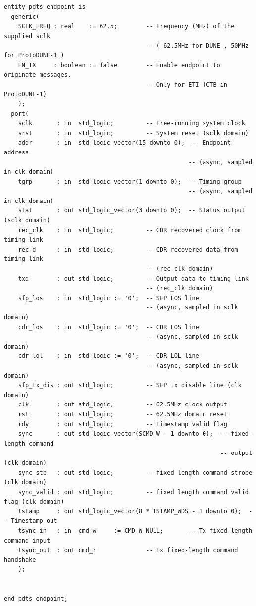 \documentclass{dune}
\begin{document}
\begin{verbatim}
entity pdts_endpoint is
  generic(
    SCLK_FREQ : real    := 62.5;        -- Frequency (MHz) of the supplied sclk
                                        -- ( 62.5MHz for DUNE , 50MHz for ProtoDUNE-1 )
    EN_TX     : boolean := false        -- Enable endpoint to originate messages.
                                        -- Only for ETI (CTB in ProtoDUNE-1)
    );
  port(
    sclk       : in  std_logic;         -- Free-running system clock
    srst       : in  std_logic;         -- System reset (sclk domain)
    addr       : in  std_logic_vector(15 downto 0);  -- Endpoint address
                                                    -- (async, sampled in clk domain)
    tgrp       : in  std_logic_vector(1 downto 0);  -- Timing group
                                                    -- (async, sampled in clk domain)
    stat       : out std_logic_vector(3 downto 0);  -- Status output (sclk domain)
    rec_clk    : in  std_logic;         -- CDR recovered clock from timing link
    rec_d      : in  std_logic;         -- CDR recovered data from timing link
                                        -- (rec_clk domain)
    txd        : out std_logic;         -- Output data to timing link
                                        -- (rec_clk domain)
    sfp_los    : in  std_logic := '0';  -- SFP LOS line
                                        -- (async, sampled in sclk domain)
    cdr_los    : in  std_logic := '0';  -- CDR LOS line
                                        -- (async, sampled in sclk domain)
    cdr_lol    : in  std_logic := '0';  -- CDR LOL line
                                        -- (async, sampled in sclk domain)
    sfp_tx_dis : out std_logic;         -- SFP tx disable line (clk domain)
    clk        : out std_logic;         -- 62.5MHz clock output
    rst        : out std_logic;         -- 62.5MHz domain reset
    rdy        : out std_logic;         -- Timestamp valid flag
    sync       : out std_logic_vector(SCMD_W - 1 downto 0);  -- fixed-length command
                                                             -- output (clk domain)
    sync_stb   : out std_logic;         -- fixed length command strobe (clk domain)
    sync_valid : out std_logic;         -- fixed length command valid flag (clk domain)
    tstamp     : out std_logic_vector(8 * TSTAMP_WDS - 1 downto 0);  -- Timestamp out
    tsync_in   : in  cmd_w     := CMD_W_NULL;       -- Tx fixed-length command input
    tsync_out  : out cmd_r              -- Tx fixed-length command handshake
    );


end pdts_endpoint;
\end{verbatim}
\end{document}
